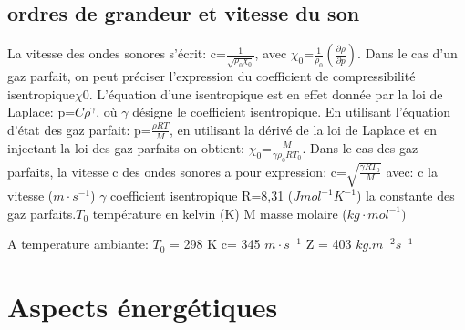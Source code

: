 \documentclass[a4paper, 12pt]{article}
\begin{document}
\subsection{ordres de grandeur et vitesse du son}
\begin{text}
La vitesse des ondes sonores s'écrit:\newline 
c=$\frac{1}{\sqrt{\rho_{0}\chi_{0}}}$, avec $\chi_{0}$=$\frac{1}{\rho_{0}}(\frac{\partial \rho}{\partial p})$.\newline 
Dans le cas d'un gaz parfait, on peut préciser l'expression du coefficient de compressibilité isentropique$\chi{0}$. L'équation d'une isentropique est en effet donnée par la loi de Laplace:\newline
p=$C\rho^{\gamma}$, où $\gamma$ désigne le coefficient isentropique.\newline 
En utilisant l'équation d'état des gaz parfait:\newline 
p=$\frac{\rho RT}{M}$, en utilisant la dérivé de la loi de Laplace et en injectant la loi des gaz parfaits on obtient:\newline 
$\chi_{0}$=$\frac{M}{\gamma \rho_{0}RT_{0}}$.\newline 
Dans le cas des gaz parfaits, la vitesse c des ondes sonores a pour expression:\newline 
c=$\sqrt{\frac{\gamma R T_{0}}{M}}$\newline 
avec: c la vitesse ($m\cdot s^{-1}$)\newline
$\gamma$ coefficient isentropique\newline 
R=8,31 ($Jmol^{-1}K^{-1}$) la constante des gaz parfaits.\newline $T_{0}$ température en kelvin (K)\newline 
M masse molaire ($kg\cdot mol^{-1})$\newline 

A temperature ambiante:\newline 
$T_{0}$ = 298 K\newline 
c= 345 $m\cdot s^{-1}$
Z = 403 $kg.m^{-2}s^{-1}$
\end{text}
\newpage
\section{Aspects énergétiques}
\end{document}
